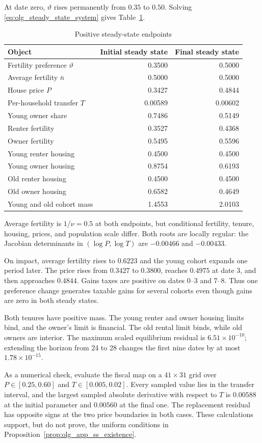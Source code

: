 At date zero, $\vartheta$ rises permanently from $0.35$ to $0.50$.  Solving
\eqref{eq:olg_steady_state_system} gives Table~\ref{tab:olg_app_steady_states}.

\begin{table}[H]
\centering
\caption{Positive steady-state endpoints}
\label{tab:olg_app_steady_states}
\footnotesize
\begin{tabular}{@{}lrr@{}}
\toprule
Object & Initial steady state & Final steady state\\
\midrule
Fertility preference $\vartheta$ & 0.3500 & 0.5000\\
Average fertility $\bar n$ & 0.5000 & 0.5000\\
House price $P$ & 0.3427 & 0.4844\\
Per-household transfer $T$ & 0.00589 & 0.00602\\
Young owner share & 0.7486 & 0.5149\\
Renter fertility & 0.3527 & 0.4368\\
Owner fertility & 0.5495 & 0.5596\\
Young renter housing & 0.4500 & 0.4500\\
Young owner housing & 0.8754 & 0.6193\\
Old renter housing & 0.4500 & 0.4500\\
Old owner housing & 0.6582 & 0.4649\\
Young and old cohort mass & 1.4553 & 2.0103\\
\bottomrule
\end{tabular}
\end{table}

Average fertility is $1/\nu=0.5$ at both endpoints, but conditional fertility,
tenure, housing, prices, and population scale differ.  Both roots are locally
regular: the Jacobian determinants in $(\log P,\log T)$ are $-0.00466$ and
$-0.00433$.

On impact, average fertility rises to $0.6223$ and the young cohort expands one
period later.  The price rises from $0.3427$ to $0.3800$, reaches $0.4975$ at
date 3, and then approaches $0.4844$.  Gains taxes are positive on dates 0--3
and 7--8.  Thus one preference change generates taxable gains for several
cohorts even though gains are zero in both steady states.

Both tenures have positive mass.  The young renter and owner housing limits
bind, and the owner's limit is financial.  The old rental limit binds, while
old owners are interior.  The maximum scaled equilibrium residual is
$6.51\times10^{-10}$; extending the horizon from 24 to 28 changes the first
nine dates by at most $1.78\times10^{-15}$.

As a numerical check, evaluate the fiscal map on a $41\times31$ grid over
$P\in[0.25,0.60]$ and $T\in[0.005,0.02]$.  Every sampled value lies in the
transfer interval, and the largest sampled absolute derivative with respect to
$T$ is $0.00588$ at the initial parameter and $0.00560$ at the final one.  The
replacement residual has opposite signs at the two price boundaries in both
cases.  These calculations support, but do not prove, the uniform conditions
in Proposition~\ref{prop:olg_app_ss_existence}.
